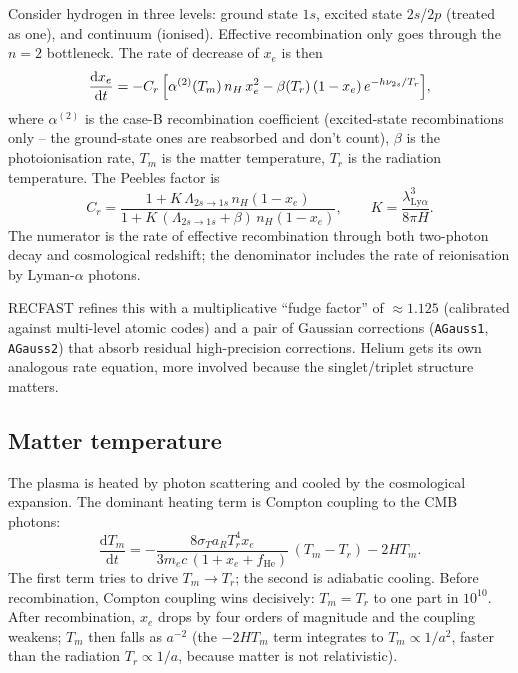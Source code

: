 Consider hydrogen in three levels: ground state $1s$, excited state $2s$/$2p$ (treated as one), and continuum (ionised). Effective recombination only goes through the $n = 2$ bottleneck. The rate of decrease of $x_e$ is then
\begin{equation}
  \frac{\mathrm{d}x_e}{\mathrm{d}t} = -C_r\,\Bigl[ \alpha^{(2)}(T_m)\, n_H\, x_e^2 - \beta(T_r)\, (1 - x_e)\, e^{-h\nu_{2s}/T_r}\Bigr],
  \label{eq:Peebles}
\end{equation}
where $\alpha^{(2)}$ is the case-B recombination coefficient (excited-state recombinations only -- the ground-state ones are reabsorbed and don't count), $\beta$ is the photoionisation rate, $T_m$ is the matter temperature, $T_r$ is the radiation temperature. The Peebles factor is
\begin{equation}
  C_r = \frac{1 + K\, \Lambda_{2s\to 1s}\, n_H (1 - x_e)}
             {1 + K\, (\Lambda_{2s\to 1s} + \beta)\, n_H (1 - x_e)},
  \qquad
  K = \frac{\lambda_{\mathrm{Ly}\alpha}^3}{8\pi H}.
\end{equation}
The numerator is the rate of effective recombination through both two-photon decay and cosmological redshift; the denominator includes the rate of reionisation by Lyman-$\alpha$ photons.

RECFAST refines this with a multiplicative ``fudge factor'' of $\approx 1.125$ (calibrated against multi-level atomic codes) and a pair of Gaussian corrections (\texttt{AGauss1}, \texttt{AGauss2}) that absorb residual high-precision corrections. Helium gets its own analogous rate equation, more involved because the singlet/triplet structure matters.

\subsection{Matter temperature}

The plasma is heated by photon scattering and cooled by the cosmological expansion. The dominant heating term is Compton coupling to the CMB photons:
\begin{equation}
  \frac{\mathrm{d}T_m}{\mathrm{d}t} = -\frac{8 \sigma_T a_R T_r^4 x_e}{3 m_e c\, (1 + x_e + f_\mathrm{He})}\,(T_m - T_r) - 2 H T_m.
  \label{eq:Tmat_eq}
\end{equation}
The first term tries to drive $T_m \to T_r$; the second is adiabatic cooling. Before recombination, Compton coupling wins decisively: $T_m = T_r$ to one part in $10^{10}$. After recombination, $x_e$ drops by four orders of magnitude and the coupling weakens; $T_m$ then falls as $a^{-2}$ (the $-2HT_m$ term integrates to $T_m \propto 1/a^2$, faster than the radiation $T_r \propto 1/a$, because matter is not relativistic).

